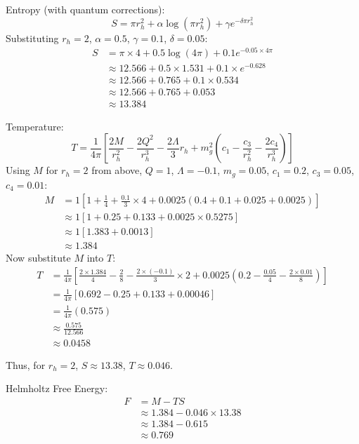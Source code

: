 \documentclass[superscriptaddress, prd, aps,amsmath,amssymb,showpacs,showkeys, onecolumn]{revtex4-2}
\begin{document}
Entropy (with quantum corrections):
\begin{equation}
S = \pi r_h^2 + \alpha \log(\pi r_h^2) + \gamma e^{-\delta \pi r_h^2}
\end{equation}
Substituting $r_h = 2$, $\alpha = 0.5$, $\gamma = 0.1$, $\delta = 0.05$:
\begin{align*}
S &= \pi \times 4 + 0.5 \log(4\pi) + 0.1 e^{-0.05 \times 4\pi} \\
  &\approx 12.566 + 0.5 \times 1.531 + 0.1 \times e^{-0.628} \\
  &\approx 12.566 + 0.765 + 0.1 \times 0.534 \\
  &\approx 12.566 + 0.765 + 0.053 \\
  &\approx 13.384
\end{align*}

Temperature:
\begin{equation}
T = \frac{1}{4\pi} \left[ \frac{2M}{r_h^2} - \frac{2Q^2}{r_h^3} - \frac{2\Lambda}{3} r_h + m_g^2 \left(c_1 - \frac{c_3}{r_h^2} - \frac{2c_4}{r_h^3}\right) \right]
\end{equation}
Using $M$ for $r_h = 2$ from above, $Q = 1$, $\Lambda = -0.1$, $m_g = 0.05$, $c_1 = 0.2$, $c_3 = 0.05$, $c_4 = 0.01$:
\begin{align*}
M &= 1 \left[1 + \frac{1}{4} + \frac{0.1}{3} \times 4 + 0.0025 (0.4 + 0.1 + 0.025 + 0.0025)\right] \\
  &\approx 1 [1 + 0.25 + 0.133 + 0.0025 \times 0.5275] \\
  &\approx 1 [1.383 + 0.0013] \\
  &\approx 1.384
\end{align*}
Now substitute $M$ into $T$:
\begin{align*}
T &= \frac{1}{4\pi} \left[ \frac{2 \times 1.384}{4} - \frac{2}{8} - \frac{2 \times (-0.1)}{3} \times 2 + 0.0025 (0.2 - \frac{0.05}{4} - \frac{2 \times 0.01}{8}) \right] \\
  &= \frac{1}{4\pi} [0.692 - 0.25 + 0.133 + 0.00046] \\
  &= \frac{1}{4\pi} (0.575) \\
  &\approx \frac{0.575}{12.566} \\
  &\approx 0.0458
\end{align*}

Thus, for $r_h = 2$, $S \approx 13.38$, $T \approx 0.046$.

Helmholtz Free Energy:
\begin{align*}
F &= M - T S \\
  &\approx 1.384 - 0.046 \times 13.38 \\
  &\approx 1.384 - 0.615 \\
  &\approx 0.769
\end{align*}
\end{document}
